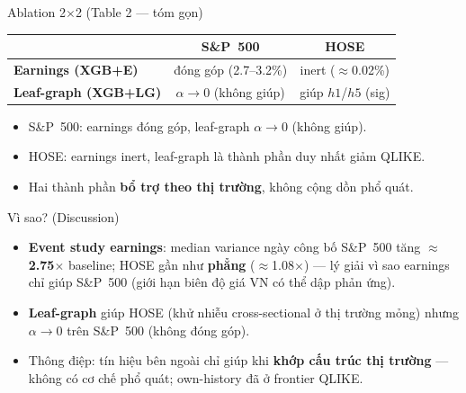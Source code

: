 \documentclass[aspectratio=169]{beamer}
\begin{document}
\begin{frame}{Ablation 2$\times$2 (Table 2 --- tóm gọn)}
  \begin{center}
  \renewcommand{\arraystretch}{1.3}
  \begin{tabular}{l|c|c}
     & \textbf{S\&P~500} & \textbf{HOSE} \\
    \hline
    \textbf{Earnings (XGB+E)} & \cellcolor{green!15} đóng góp (2.7--3.2\%) & inert ($\approx$0.02\%) \\
    \hline
    \textbf{Leaf-graph (XGB+LG)} & $\alpha\to0$ (không giúp) & \cellcolor{green!15} giúp $h1$/$h5$ (sig) \\
  \end{tabular}
  \end{center}
  \vspace{1em}
  \begin{itemize}
    \item S\&P~500: earnings đóng góp, leaf-graph $\alpha\to0$ (không giúp).
    \item HOSE: earnings inert, leaf-graph là thành phần duy nhất giảm QLIKE.
    \item Hai thành phần \textbf{bổ trợ theo thị trường}, không cộng dồn phổ quát.
  \end{itemize}
\end{frame}

\begin{frame}{Vì sao? (Discussion)}
  \begin{itemize}
    \item \textbf{Event study earnings}: median variance ngày công bố S\&P~500 tăng $\approx$\textbf{2.75$\times$} baseline; HOSE gần như \textbf{phẳng} ($\approx$1.08$\times$) --- lý giải vì sao earnings chỉ giúp S\&P~500 (giới hạn biên độ giá VN có thể dập phản ứng).
    \item \textbf{Leaf-graph} giúp HOSE (khử nhiễu cross-sectional ở thị trường mỏng) nhưng $\alpha\to0$ trên S\&P~500 (không đóng góp).
    \item Thông điệp: tín hiệu bên ngoài chỉ giúp khi \textbf{khớp cấu trúc thị trường} --- không có cơ chế phổ quát; own-history đã ở frontier QLIKE.
  \end{itemize}
\end{frame}
\end{document}
